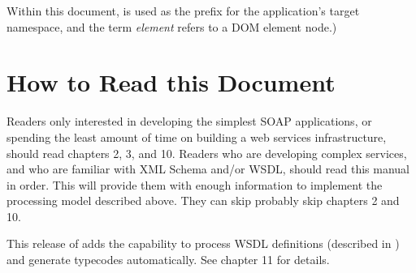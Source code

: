 Within this document,  is used as the prefix for the
application's target namespace, and the term
\emph{element} refers to a DOM element node.)

\section{How to Read this Document}

Readers only interested in developing the simplest SOAP applications,
or spending the least amount of time on building a web services
infrastructure, should read chapters 2, 3, and 10.
Readers who are developing complex services, and who are familiar
with XML Schema and/or WSDL, should read this manual in order.
This will provide them with enough information to implement the
processing model described above.
They can skip probably skip chapters 2 and 10.

This release of \ZSI{} adds the capability to 
process WSDL definitions (described in
)
and generate typecodes automatically.  See chapter 11
for details.

